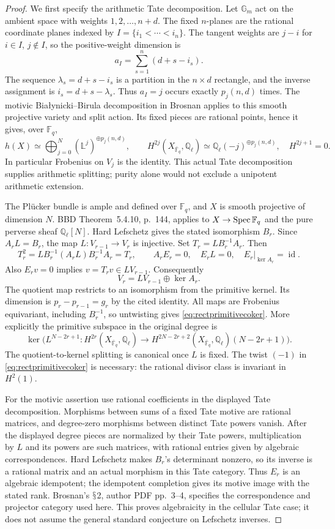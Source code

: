 \documentclass[11pt,a4paper]{article}
\newcommand{\Q}{\mathbb Q}\newcommand{\Z}{\mathbb Z}\newcommand{\C}{\mathbb C}\newcommand{\N}{\mathbb N}\newcommand{\F}{\mathbb F}
\newcommand{\id}{\operatorname{id}}\newcommand{\et}{\mathrm{\acute et}}\newcommand{\boxt}{\boxtimes}
\renewcommand{\S}{\ensuremath{\mathsection}}
\theoremstyle{named}\newtheorem{finding}{Finding}[section]
\theoremstyle{definition}\newtheorem{definition}[finding]{Definition}
\theoremstyle{remark}\newtheorem{remark}[finding]{Remark}
\begin{document}
\begin{proof}
We first specify the arithmetic Tate decomposition. Let $\mathbb G_m$
act on the ambient space with weights $1,2,\ldots,n+d$.
The fixed $n$-planes are the rational coordinate planes indexed by
$I=\{i_1<\cdots<i_n\}$. The tangent weights are $j-i$ for
$i\in I$, $j\notin I$, so the positive-weight dimension is
\[
 a_I=\sum_{s=1}^n(d+s-i_s).
\]
The sequence $\lambda_s=d+s-i_s$ is a partition in the
$n\times d$ rectangle, and the inverse assignment is
$i_s=d+s-\lambda_s$. Thus $a_I=j$ occurs exactly $p_j(n,d)$
times. The motivic Bia\l ynicki--Birula decomposition in
Brosnan \cite[Theorems~3.3 and~3.5, author PDF pp.~5--6]{Brosnan}
applies to this smooth projective variety and split action.
Its fixed pieces are rational points, hence it gives, over $\F_q$,
\[
 h(X)\simeq\bigoplus_{j=0}^{N}(\mathbb L^j)^{\oplus p_j(n,d)},
 \qquad
 H^{2j}(X_{\bar{\F}_q},\Q_\ell)
    \simeq\Q_\ell(-j)^{\oplus p_j(n,d)},\quad H^{2j+1}=0.
\]
In particular Frobenius on $V_j$ is the identity. This actual
Tate decomposition supplies arithmetic splitting; purity alone
would not exclude a unipotent arithmetic extension.

The Pl\"ucker bundle is ample and defined over $\F_q$, and
$X$ is smooth projective of dimension $N$. BBD Theorem~5.4.10,
p.~144, applies to $X\to\Spec\F_q$ and the pure perverse
sheaf $\Q_\ell[N]$. Hard Lefschetz gives the stated isomorphism
$B_r$. Since $A_rL=B_r$, the map $L:V_{r-1}\to V_r$ is injective.
Set $T_r=L B_r^{-1}A_r$. Then
\[
 T_r^2=L B_r^{-1}(A_rL)B_r^{-1}A_r=T_r,\qquad
 A_r E_r=0,\quad E_r L=0,\quad
 E_r|_{\ker A_r}=\id.
\]
Also $E_rv=0$ implies $v=T_rv\in L V_{r-1}$.
Consequently
\[
 V_r=L V_{r-1}\oplus\ker A_r.
\]
The quotient map restricts to an isomorphism from the primitive
kernel. Its dimension is $p_r-p_{r-1}=g_r$ by the cited identity.
All maps are Frobenius equivariant, including $B_r^{-1}$, so
untwisting gives \eqref{eq:rectprimitivecoker}. More explicitly
the primitive subspace in the original degree is
\[
 \ker\bigl(L^{N-2r+1}:H^{2r}(X_{\bar{\F}_q},\Q_\ell)
 \longrightarrow
 H^{2N-2r+2}(X_{\bar{\F}_q},\Q_\ell)(N-2r+1)\bigr).
\]
The quotient-to-kernel splitting is canonical once $L$ is fixed.
The twist $(-1)$ in \eqref{eq:rectprimitivecoker} is necessary:
the rational divisor class is invariant in $H^2(1)$.

For the motivic assertion use rational coefficients in the displayed
Tate decomposition. Morphisms between sums of a fixed Tate motive
are rational matrices, and degree-zero morphisms between distinct
Tate powers vanish. After the displayed degree pieces are normalized
by their Tate powers, multiplication by $L$ and its powers are such
matrices, with rational entries given by algebraic correspondences.
Hard Lefschetz makes $B_r$'s determinant nonzero, so its inverse
is a rational matrix and an actual morphism in this Tate category.
Thus $E_r$ is an algebraic idempotent; the idempotent completion
gives its motive image with the stated rank. Brosnan's \S2,
author PDF pp.~3--4, specifies the correspondence and projector
category used here. This proves algebraicity in the cellular Tate
case; it does not assume the general standard conjecture on
Lefschetz inverses.


\end{proof}
\end{document}
